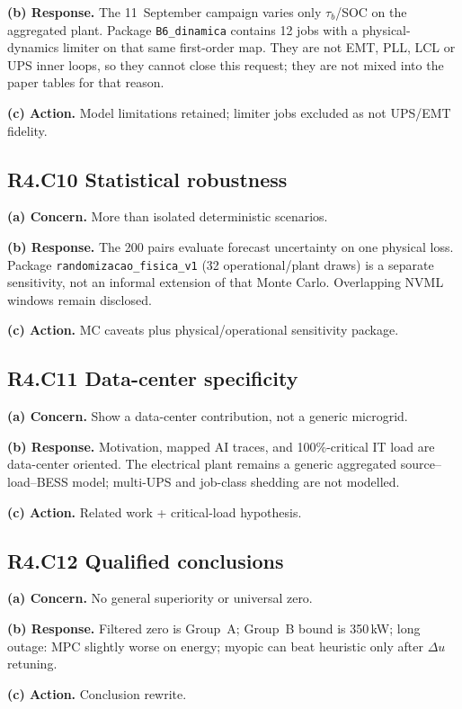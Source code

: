\documentclass[11pt]{article}
\begin{document}
\textbf{(b) Response.} The 11~September campaign varies only $\tau_b$/SOC on the aggregated plant. Package \texttt{B6\_dinamica} contains 12 jobs with a physical-dynamics limiter on that same first-order map. They are not EMT, PLL, LCL or UPS inner loops, so they cannot close this request; they are not mixed into the paper tables for that reason.

\textbf{(c) Action.} Model limitations retained; limiter jobs excluded as not UPS/EMT fidelity.

\subsection*{R4.C10 Statistical robustness}
\textbf{(a) Concern.} More than isolated deterministic scenarios.

\textbf{(b) Response.} The 200 pairs evaluate forecast uncertainty on one physical loss. Package \texttt{randomizacao\_fisica\_v1} (32 operational/plant draws) is a separate sensitivity, not an informal extension of that Monte Carlo. Overlapping NVML windows remain disclosed.

\textbf{(c) Action.} MC caveats plus physical/operational sensitivity package.

\subsection*{R4.C11 Data-center specificity}
\textbf{(a) Concern.} Show a data-center contribution, not a generic microgrid.

\textbf{(b) Response.} Motivation, mapped AI traces, and 100\%-critical IT load are data-center oriented. The electrical plant remains a generic aggregated source--load--BESS model; multi-UPS and job-class shedding are not modelled.

\textbf{(c) Action.} Related work + critical-load hypothesis.

\subsection*{R4.C12 Qualified conclusions}
\textbf{(a) Concern.} No general superiority or universal zero.

\textbf{(b) Response.} Filtered zero is Group~A; Group~B bound is 350\,kW; long outage: MPC slightly worse on energy; myopic can beat heuristic only after $\Delta u$ retuning.

\textbf{(c) Action.} Conclusion rewrite.

\end{document}
